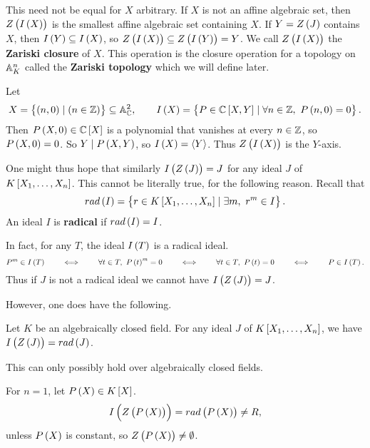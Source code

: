 This need not be equal for $ X $ arbitrary. If $ X $ is not an affine algebraic set, then $ Z\br{I\br{X}} $ is the smallest affine algebraic set containing $ X $. If $ Y = Z\br{J} $ contains $ X $, then $ I\br{Y} \subseteq I\br{X} $, so $ Z\br{I\br{X}} \subseteq Z\br{I\br{Y}} = Y $. We call $ Z\br{I\br{X}} $ the \textbf{Zariski closure} of $ X $. This operation is the closure operation for a topology on $ \mathbb{A}_K^n $ called the \textbf{Zariski topology} which we will define later.

\begin{example*}
Let
$$ X = \cbr{\br{n, 0} \mid \br{n \in \Z}} \subseteq \A_\C^2, \qquad I\br{X} = \cbr{P \in \C\sbr{X, Y} \mid \forall n \in \Z, \ P\br{n, 0} = 0}. $$
Then $ P\br{X, 0} \in \C\sbr{X} $ is a polynomial that vanishes at every $ n \in \mathbb{Z} $, so $ P\br{X, 0} = 0 $. So $ Y \mid P\br{X, Y} $, so $ I\br{X} = \abr{Y} $. Thus $ Z\br{I\br{X}} $ is the $ Y $-axis.
\end{example*}

\pagebreak

One might thus hope that similarly $ I\br{Z\br{J}} = J $ for any ideal $ J $ of $ K\sbr{X_1, \dots, X_n} $. This cannot be literally true, for the following reason. Recall that
$$ rad\br{I} = \cbr{r \in K\sbr{X_1, \dots, X_n} \mid \exists m, \ r^m \in I}. $$
An ideal $ I $ is \textbf{radical} if $ rad\br{I} = I $.

\begin{note*}
In fact, for any $ T $, the ideal $ I\br{T} $ is a radical ideal.
$$ P^m \in I\br{T} \qquad \iff \qquad \forall t \in T, \ P\br{t}^m = 0 \qquad \iff \qquad \forall t \in T, \ P\br{t} = 0 \qquad \iff \qquad P \in I\br{T}. $$
Thus if $ J $ is not a radical ideal we cannot have $ I\br{Z\br{J}} = J $.
\end{note*}

However, one does have the following.

\begin{theorem}
\label{thm:13.2.5}
Let $ K $ be an algebraically closed field. For any ideal $ J $ of $ K\sbr{X_1, \dots, X_n} $, we have $ I\br{Z\br{J}} = rad\br{J} $.
\end{theorem}

\begin{note*}
This can only possibly hold over algebraically closed fields.
\end{note*}

\begin{example*}
For $ n = 1 $, let $ P\br{X} \in K\sbr{X} $.
$$ I\br{Z\br{P\br{X}}} = rad\br{P\br{X}} \ne R, $$
unless $ P\br{X} $ is constant, so $ Z\br{P\br{X}} \ne \emptyset $.
\end{example*}

